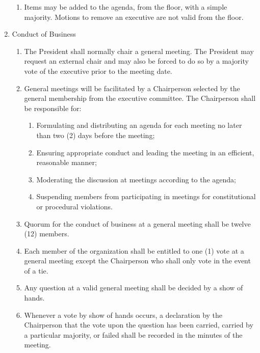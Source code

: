 \documentclass[12pt,a4paper]{article}
\begin{document}
\begin{enumerate}
\begin{enumerate}
\item Items may be added to the agenda, from the floor, with a simple majority. Motions to remove an executive are not valid from the floor.
\end{enumerate}

\item Conduct of Business

\begin{enumerate}
\item The President shall normally chair a general meeting. The President may request an external chair and may also be forced to do so by a majority vote of the executive prior to the meeting date.  

\item General meetings will be facilitated by a Chairperson selected by the general membership from the executive committee.
The Chairperson shall be responsible for:

\begin{enumerate}
\item Formulating and distributing an agenda for each meeting no later than two (2) days before the meeting;

\item Ensuring appropriate conduct and leading the meeting in an efficient, reasonable manner;

\item Moderating the discussion at meetings according to the agenda;

\item Suspending members from participating in meetings for constitutional or procedural violations.
\end{enumerate}

\item Quorum for the conduct of business at a general meeting shall be twelve (12) members.

\item Each member of the organization shall be entitled to one (1) vote at a general meeting except the
Chairperson who shall only vote in the event of a tie.

\item Any question at a valid general meeting shall be decided by a show of hands.

\item Whenever a vote by show of hands occurs, a declaration by the Chairperson that the vote upon the question has been carried, carried by a particular majority, or failed shall be recorded in the minutes of the meeting.


\end{enumerate}
\end{enumerate}
\end{document}

